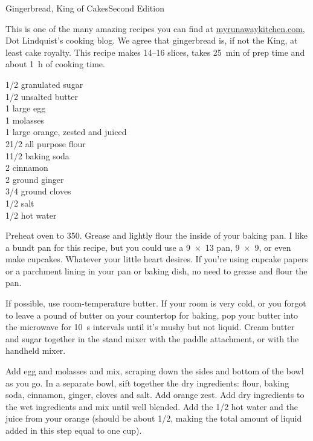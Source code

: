 \begin{entry}{Gingerbread, King of Cakes}{Second Edition}

\begin{open}
    This is one of the many amazing recipes you can find at
    \url{myrunawaykitchen.com}, Dot Lindquist's cooking blog.  We agree that
    gingerbread is, if not the King, at least cake royalty.  This recipe makes
    \numrange{14}{16} slices, takes \SI{25}{\minute} of prep time and about
    \SI{1}{\hour} of cooking time.
\end{open}
\begin{ingredients}
    \SI{1/2}{\cup}  granulated sugar\\
    \SI{1/2}{\cup}  unsalted butter\\
    1 large egg\\
    \SI{1}{\cup} molasses\\
    1 large orange, zested and juiced\\
    2\SI{1/2}{\cup}  all purpose flour\\
    1\SI{1/2}{\teaspoon}  baking soda\\
    \SI{2}{\teaspoon} cinnamon\\
    \SI{2}{\teaspoon} ground ginger\\
    \SI{3/4}{\teaspoon}   ground cloves\\
    \SI{1/2}{\teaspoon}  salt\\
    \SI{1/2}{\cup}  hot water
\end{ingredients}
Preheat oven to \SI{350}{\degreeF}. Grease and lightly flour the inside of your
baking pan. I like a bundt pan for this recipe, but you could use a
\SI{9x13}{\inch} pan, \SI{9x9}{\inch}, or even make cupcakes. Whatever your
little heart desires. If you're using cupcake papers or a parchment lining in
your pan or baking dish, no need to grease and flour the pan.

If possible, use room-temperature butter. If your room is very cold, or you
forgot to leave a pound of butter on your countertop for baking, pop your butter
into the microwave for \SI{10}{\second} intervals until it's mushy but not
liquid. Cream butter and sugar together in the stand mixer with the paddle
attachment, or with the handheld mixer.

Add egg and molasses and mix, scraping down the sides and bottom of the bowl as
you go. In a separate bowl, sift together the dry ingredients: flour, baking
soda, cinnamon, ginger, cloves and salt. Add orange zest. Add dry ingredients to
the wet ingredients and mix until well blended. Add the \SI{1/2}{\cup} hot water
and the juice from your orange (should be about \SI{1/2}{\cup}, making the total
amount of liquid added in this step equal to one cup).


\end{entry}
